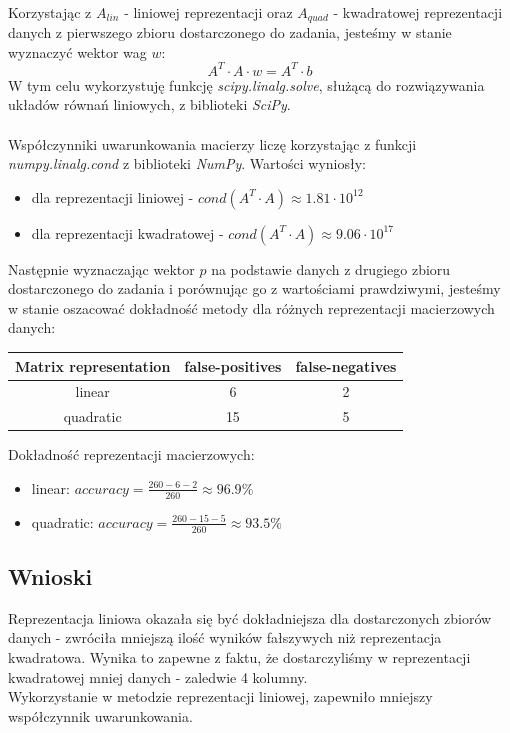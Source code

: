 \documentclass{article}
\begin{document}
\\
Korzystając z $A_{lin}$ - liniowej reprezentacji oraz $A_{quad}$ - 
kwadratowej reprezentacji danych z pierwszego zbioru dostarczonego do zadania, jesteśmy w 
stanie wyznaczyć wektor wag $w$:
$$ A^T \cdot A \cdot w = A^T \cdot b$$
W tym celu wykorzystuję funkcję \textit{scipy.linalg.solve}, służącą do rozwiązywania 
układów równań liniowych, z biblioteki \textit{SciPy}. \\\\
Współczynniki uwarunkowania macierzy liczę korzystając z funkcji \textit{numpy.linalg.cond} 
z biblioteki \textit{NumPy}.
Wartości wyniosły:
\begin{itemize}
  \item dla reprezentacji liniowej - $cond(A^T\cdot A)\approx 1.81\cdot 10^{12}$
  \item dla reprezentacji kwadratowej - $cond(A^T\cdot A)\approx 9.06\cdot 10^{17}$
\end{itemize}
Następnie wyznaczając wektor $p$ na podstawie danych z drugiego zbioru dostarczonego do
zadania i porównując go z wartościami prawdziwymi, jesteśmy w stanie oszacować dokładność
metody dla różnych reprezentacji macierzowych danych:
\begin{center}
  \begin{tabular}{  |c|c|c| } 
   \hline
   Matrix representation & false-positives & false-negatives\\
   \hline
   linear & 6 & 2\\
   \hline
   quadratic & 15 & 5\\
   \hline
  \end{tabular}
\end{center}
Dokładność reprezentacji macierzowych:
\begin{itemize}
  \item linear: $accuracy = \frac{260-6-2}{260} \approx 96.9 \%$
  \item quadratic: $accuracy = \frac{260-15-5}{260} \approx 93.5 \%$
\end{itemize}
  \subsection*{Wnioski}
\null\quad Reprezentacja liniowa okazała się być dokładniejsza dla dostarczonych
zbiorów danych - zwróciła mniejszą
ilość wyników fałszywych niż reprezentacja kwadratowa. Wynika to zapewne
z faktu, że dostarczyliśmy w reprezentacji kwadratowej mniej danych - 
zaledwie 4 kolumny. \\
Wykorzystanie w metodzie reprezentacji liniowej, zapewniło 
mniejszy współczynnik uwarunkowania.
\end{document}
